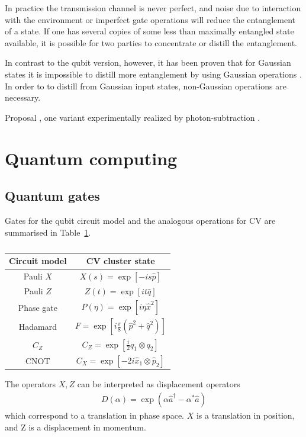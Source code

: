 \documentclass[pra,
superscriptaddress,
 amsmath,amssymb,
 aps,twocolumn]{revtex4-1}
\begin{document}
In practice the transmission channel is never perfect, and noise due to interaction with the environment or imperfect gate operations will reduce the entanglement of a state. If one has several copies of some less than maximally entangled state available, it is possible for two parties to concentrate or distill the entanglement.

In contrast to the qubit version, however, it has been proven that for Gaussian states
it is impossible to distill more entanglement by using Gaussian operations \cite{bib:PhysRevLett.89.137904, bib:PhysRevLett.89.137903, bib:PhysRevA.66.032316}. In order to to distill from Gaussian input states, non-Gaussian operations are necessary.
 
Proposal \cite{bib:eisert2004distillation}, one variant experimentally realized by photon-subtraction \cite{bib:takahashi2010entanglement}.

\section{Quantum computing}



\subsection{Quantum gates}

Gates for the qubit circuit model and the analogous operations for CV are summarised in Table~\ref{tabgates}. \cite{bib:RevModPhys.84.621}
\begin{table}
\begin{tabular}{ |c|c| } 
 \hline
 Circuit model &  CV cluster state \\ 
  \hline\hline
 Pauli $X$ & $X(s) = \exp[-i s \hat p]$  \\ 
 Pauli $Z$ & $Z(t) = \exp[i t \hat q]$  \\ 
 Phase gate & $\hat P (\eta) = \exp[i \eta \hat x^2]$ \\
Hadamard   & $F=\exp[i \frac{\pi}{8}(\hat p^2+\hat q^2)]$ \\
$C_Z$	   & $C_Z= \exp[\frac{i}{2}q_1 \otimes q_2]$ \\
CNOT 	   & $C_X = \exp[-2i\hat x_1 \otimes \hat p_2]$\\
\hline
\end{tabular}
\caption{\label{tabgates}}
\end{table}
%  

The operators $X,Z$ can be interpreted as displacement operators
\begin{align}
D(\alpha) = \exp(\alpha \hat a^\dagger - \alpha^* \hat a)
\end{align}
which correspond to a translation in phase space. $X$ is a translation in position, and Z is a displacement in momentum.
\end{document}
